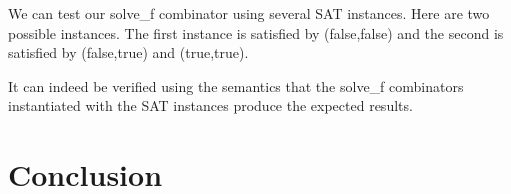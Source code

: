 \documentclass{llncs}
\begin{document}
We can test our {{solve_f}} combinator using several SAT
instances. Here are two possible instances. The first instance is
satisfied by {{(false,false)}} and the
second is satisfied by {{(false,true)}} and {{(true,true)}}.

% 

It can indeed be verified using the semantics that the {{solve_f}}
combinators instantiated with the SAT instances produce the expected
results. 

\section{Conclusion}


 

\end{document}
